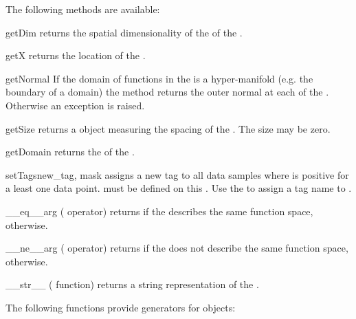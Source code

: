 \vspace{1em}\noindent The following methods are available:
%
\begin{methoddesc}[FunctionSpace]{getDim}{}
    returns the spatial dimensionality of the \Domain of the \FunctionSpace.
\end{methoddesc}
%
\begin{methoddesc}[FunctionSpace]{getX}{}
    returns the location of the \DataSamplePoints.
\end{methoddesc}
%
\begin{methoddesc}[FunctionSpace]{getNormal}{}
    If the domain of functions in the \FunctionSpace is a hyper-manifold (e.g.
    the boundary of a domain) the method returns the outer normal at each of
    the \DataSamplePoints. Otherwise an exception is raised.
\end{methoddesc}
%
\begin{methoddesc}[FunctionSpace]{getSize}{}
    returns a \Data object measuring the spacing of the \DataSamplePoints.
    The size may be zero.
\end{methoddesc}
%
\begin{methoddesc}[FunctionSpace]{getDomain}{}
    returns the \Domain of the \FunctionSpace.
\end{methoddesc}
%
\begin{methoddesc}[FunctionSpace]{setTags}{new_tag, mask}
    assigns a new tag  to all data samples where  is
    positive for a least one data point.
     must be defined on this \FunctionSpace.
    Use the  to assign a tag name to .
\end{methoddesc}
%
\begin{methoddesc}[FunctionSpace]{__eq__}{arg}
    (\PYTHON \var{==} operator) returns \True if the \FunctionSpace {}
    describes the same function space, \False otherwise.
\end{methoddesc}
%
\begin{methoddesc}[FunctionSpace]{__ne__}{arg}
    (\PYTHON \var{!=} operator) returns \True if the \FunctionSpace {}
    does not describe the same function space, \False otherwise.
\end{methoddesc}

\begin{methoddesc}[Domain]{__str__}{}
    (\PYTHON {} function) returns a string representation of the
    \FunctionSpace.
\end{methoddesc}

\noindent The following functions provide generators for \FunctionSpace objects:

